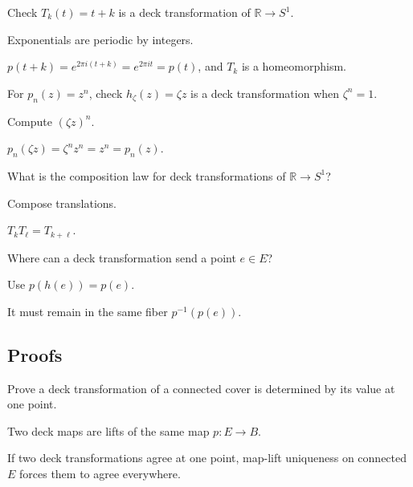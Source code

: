 \begin{exercise}\label{exr:viii12-ped-02}
Check $T_k(t)=t+k$ is a deck transformation of $\mathbb R\to S^1$.
\end{exercise}
\begin{hint}
Exponentials are periodic by integers.
\end{hint}
\begin{solution}
$p(t+k)=e^{2\pi i(t+k)}=e^{2\pi it}=p(t)$, and $T_k$ is a homeomorphism.
\end{solution}

\begin{exercise}\label{exr:viii12-ped-03}
For $p_n(z)=z^n$, check $h_\zeta(z)=\zeta z$ is a deck transformation when $\zeta^n=1$.
\end{exercise}
\begin{hint}
Compute $(\zeta z)^n$.
\end{hint}
\begin{solution}
$p_n(\zeta z)=\zeta^nz^n=z^n=p_n(z)$.
\end{solution}

\begin{exercise}\label{exr:viii12-ped-04}
What is the composition law for deck transformations of $\mathbb R\to S^1$?
\end{exercise}
\begin{hint}
Compose translations.
\end{hint}
\begin{solution}
$T_kT_\ell=T_{k+\ell}$.
\end{solution}

\begin{exercise}\label{exr:viii12-ped-05}
Where can a deck transformation send a point $e\in E$?
\end{exercise}
\begin{hint}
Use $p(h(e))=p(e)$.
\end{hint}
\begin{solution}
It must remain in the same fiber $p^{-1}(p(e))$.
\end{solution}

\subsection*{Proofs}

\begin{exercise}\label{exr:viii12-ped-06}
Prove a deck transformation of a connected cover is determined by its value at one point.
\end{exercise}
\begin{hint}
Two deck maps are lifts of the same map $p:E\to B$.
\end{hint}
\begin{solution}
If two deck transformations agree at one point, map-lift uniqueness on connected $E$ forces them to agree everywhere.
\end{solution}

